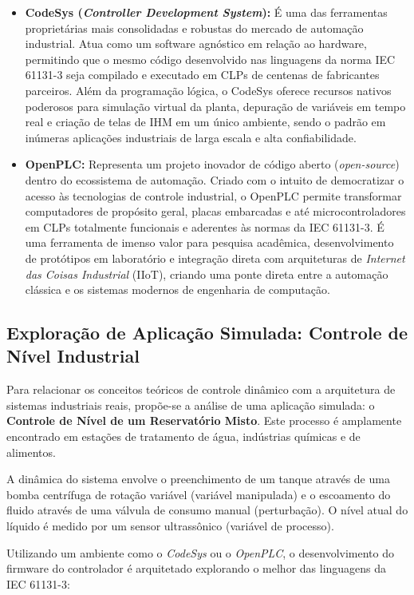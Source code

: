 \documentclass[12pt]{article}
\begin{document}
\begin{itemize}
    \item \textbf{CodeSys (\textit{Controller Development System}):} É uma das ferramentas proprietárias mais consolidadas e robustas do mercado de automação industrial. Atua como um software agnóstico em relação ao hardware, permitindo que o mesmo código desenvolvido nas linguagens da norma IEC 61131-3 seja compilado e executado em CLPs de centenas de fabricantes parceiros. Além da programação lógica, o CodeSys oferece recursos nativos poderosos para simulação virtual da planta, depuração de variáveis em tempo real e criação de telas de IHM em um único ambiente, sendo o padrão em inúmeras aplicações industriais de larga escala e alta confiabilidade.
    \item \textbf{OpenPLC:} Representa um projeto inovador de código aberto (\textit{open-source}) dentro do ecossistema de automação. Criado com o intuito de democratizar o acesso às tecnologias de controle industrial, o OpenPLC permite transformar computadores de propósito geral, placas embarcadas e até microcontroladores em CLPs totalmente funcionais e aderentes às normas da IEC 61131-3. É uma ferramenta de imenso valor para pesquisa acadêmica, desenvolvimento de protótipos em laboratório e integração direta com arquiteturas de \textit{Internet das Coisas Industrial} (IIoT), criando uma ponte direta entre a automação clássica e os sistemas modernos de engenharia de computação.
\end{itemize}

\subsection{Exploração de Aplicação Simulada: Controle de Nível Industrial}

Para relacionar os conceitos teóricos de controle dinâmico com a arquitetura de sistemas industriais reais, propõe-se a análise de uma aplicação simulada: o \textbf{Controle de Nível de um Reservatório Misto}. Este processo é amplamente encontrado em estações de tratamento de água, indústrias químicas e de alimentos.

A dinâmica do sistema envolve o preenchimento de um tanque através de uma bomba centrífuga de rotação variável (variável manipulada) e o escoamento do fluido através de uma válvula de consumo manual (perturbação). O nível atual do líquido é medido por um sensor ultrassônico (variável de processo).

Utilizando um ambiente como o \textit{CodeSys} ou o \textit{OpenPLC}, o desenvolvimento do firmware do controlador é arquitetado explorando o melhor das linguagens da IEC 61131-3:
\end{document}
